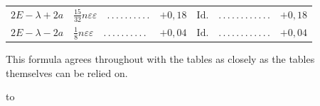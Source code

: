 \begin{landscape}
\begin{longtable}{r|p{7.8cm}r@{\quad}p{4.3cm}r}
\(2E-\lambda+2a\)&\(\tfrac{15}{32}n\varepsilon\varepsilon\quad \mathord{.}\,\mathord{.}\,\mathord{.}\,\mathord{.}\,\mathord{.}\,\mathord{.}\,\mathord{.}\,\mathord{.}\,\mathord{.}\,\mathord{.}\)&\(+0{,}18\)
&\(\text{Id.}\quad \mathord{.}\,\mathord{.}\,\mathord{.}\,\mathord{.}\,\mathord{.}\,\mathord{.}\,\mathord{.}\,\mathord{.}\,\mathord{.}\,\mathord{.}\,\mathord{.}\,\mathord{.}\)&\(+0{,}18\)\\
\(2E-\lambda-2a\)&\(\tfrac18n\varepsilon\varepsilon\quad \mathord{.}\,\mathord{.}\,\mathord{.}\,\mathord{.}\,\mathord{.}\,\mathord{.}\,\mathord{.}\,\mathord{.}\,\mathord{.}\,\mathord{.}\)&\(+0{,}04\)
&\(\text{Id.}\quad \mathord{.}\,\mathord{.}\,\mathord{.}\,\mathord{.}\,\mathord{.}\,\mathord{.}\,\mathord{.}\,\mathord{.}\,\mathord{.}\,\mathord{.}\,\mathord{.}\,\mathord{.}\)&\(+0{,}04\)
\end{longtable}
\endgroup
\par\vskip1pt\noindent\hspace*{\parindent}This formula agrees throughout with the tables as closely as the
tables themselves can be relied on.
\par\nobreak\kern2pt\nointerlineskip
\hbox to \linewidth{\hfil\rule{3cm}{.4pt}\hfil}
\end{landscape}
\endgroup
